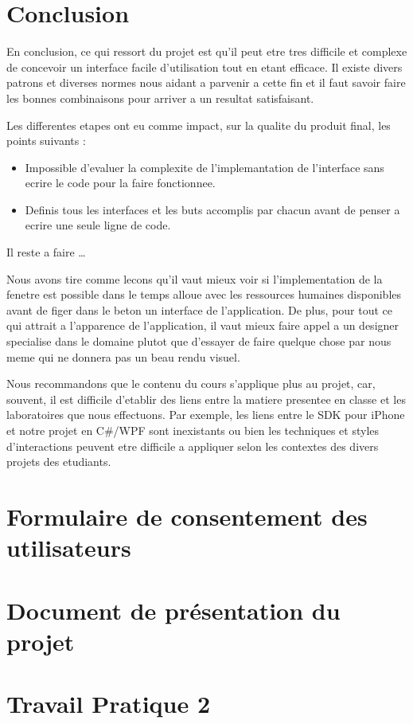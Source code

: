 \documentclass[letterpaper, oneside, 12pt, these, creativecommons]{thETS}
\begin{document}
\chapter{Conclusion}

En conclusion, ce qui ressort du projet est qu'il peut etre tres difficile et complexe de concevoir un interface facile d'utilisation tout en etant efficace. Il existe divers patrons et diverses normes nous aidant a parvenir a cette fin et il faut savoir faire les bonnes combinaisons pour arriver a un resultat satisfaisant. 

Les differentes etapes ont eu comme impact, sur la qualite du produit final, les points suivants :

\begin{itemize}
	\item Impossible d'evaluer la complexite de l'implemantation de l'interface sans ecrire le code pour la faire fonctionnee.
	\item Definis tous les interfaces et les buts accomplis par chacun avant de penser a ecrire une seule ligne de code.
\end{itemize}

Il reste a faire \dots

Nous avons tire comme lecons qu'il vaut mieux voir si l'implementation de la fenetre est possible dans le temps alloue avec les ressources humaines disponibles avant de figer dans le beton un interface de l'application. De plus, pour tout ce qui attrait a l'apparence de l'application, il vaut mieux faire appel a un designer specialise dans le domaine plutot que d'essayer de faire quelque chose par nous meme qui ne donnera pas un beau rendu visuel.

Nous recommandons que le contenu du cours s'applique plus au projet, car, souvent, il est difficile d'etablir des liens entre la matiere presentee en classe et les laboratoires que nous effectuons. Par exemple, les liens entre le SDK pour iPhone et notre projet en C\#/WPF sont inexistants ou bien les techniques et styles d'interactions peuvent etre difficile a appliquer selon les contextes des divers projets des etudiants.

\appendix
\multiannexe

\chapter{Formulaire de consentement des utilisateurs}



\chapter{Document de présentation du projet}



\chapter{Travail Pratique 2}


\end{document}

